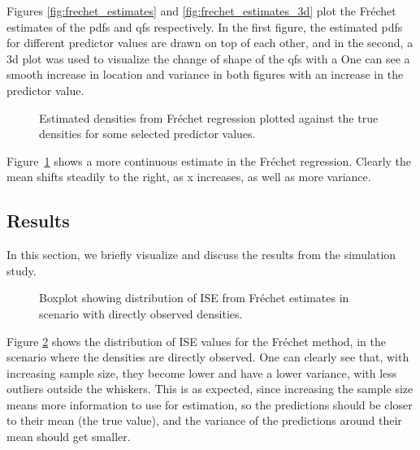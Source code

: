 Figures \ref{fig:frechet_estimates} and \ref{fig:frechet_estimates_3d} plot the Fréchet
estimates of the pdfs and qfs respectively. In the first figure, the estimated pdfs for
different predictor values are drawn on top of each other, and in the second, a 3d plot
was used to visualize the change of shape of the qfs with a One can see a smooth
increase in location and variance in both figures with an increase in the predictor
value.


\begin{figure}[h!]
    \centering
    \resizebox{1\textwidth}{!}{}
    \caption[Comparison: estimated vs. true densities --- Fréchet]{Estimated
    densities from Fréchet regression plotted against the true densities for some selected
    predictor values.}
    \label{fig:frechet_est_vs_true}
\end{figure}
Figure~\ref{fig:frechet_est_vs_true} shows a more continuous estimate in the Fréchet
regression. Clearly the mean shifts steadily to the right, as x increases, as well as
more variance.

\subsection{Results}
\label{sec:app_results}
In this section, we briefly visualize and discuss the results from the simulation study.

\begin{figure}[h!]
    \centering
    \resizebox{1\textwidth}{!}{}
    \caption[Simulation results: ISE boxplot --- Fréchet method with observed densities]{Boxplot showing distribution of
    ISE from Fréchet estimates in scenario with directly observed densities.}
    \label{fig:ise_frechet}
\end{figure}

Figure \ref{fig:ise_frechet} shows the distribution of ISE values for the Fréchet method,
in the scenario where the densities are directly observed. One can clearly see that, with
increasing sample size, they become lower and have a lower variance, with less outliers
outside the whiskers. This is as expected, since increasing the sample size
means more information to use for estimation, so the predictions should be closer to
their mean (the true value), and the variance of the predictions around their mean should
get smaller.

